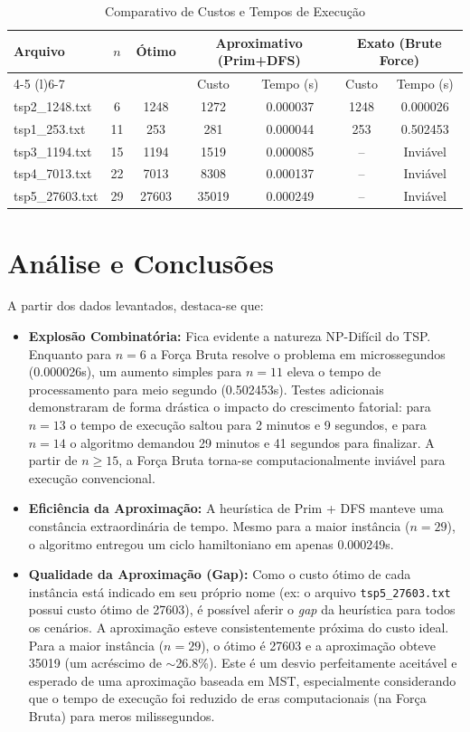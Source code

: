 \documentclass[12pt,a4paper]{article}
\begin{document}
\begin{table}[h]
\centering
\caption{Comparativo de Custos e Tempos de Execução}
\label{tab:resultados}
\vspace{0.2cm}
\begin{tabular}{@{}l c c cc cc@{}}
\toprule
\textbf{Arquivo} & \textbf{$n$} & \textbf{Ótimo} & \multicolumn{2}{c}{\textbf{Aproximativo (Prim+DFS)}} & \multicolumn{2}{c}{\textbf{Exato (Brute Force)}} \\
\cmidrule(lr){4-5} \cmidrule(l){6-7}
 & & & Custo & Tempo (s) & Custo & Tempo (s) \\
\midrule
tsp2\_1248.txt  & 6  & 1248  & 1272   & 0.000037 & 1248 & 0.000026 \\
tsp1\_253.txt   & 11 & 253   & 281    & 0.000044 & 253  & 0.502453 \\
tsp3\_1194.txt  & 15 & 1194  & 1519   & 0.000085 & --   & Inviável \\
tsp4\_7013.txt  & 22 & 7013  & 8308   & 0.000137 & --   & Inviável \\
tsp5\_27603.txt & 29 & 27603 & 35019  & 0.000249 & --   & Inviável \\
\bottomrule
\end{tabular}
\end{table}

\section{Análise e Conclusões}
A partir dos dados levantados, destaca-se que:
\begin{itemize}
    \item \textbf{Explosão Combinatória:} Fica evidente a natureza NP-Difícil do TSP. Enquanto para $n=6$ a Força Bruta resolve o problema em microssegundos (0.000026s), um aumento simples para $n=11$ eleva o tempo de processamento para meio segundo (0.502453s). Testes adicionais demonstraram de forma drástica o impacto do crescimento fatorial: para $n=13$ o tempo de execução saltou para 2 minutos e 9 segundos, e para $n=14$ o algoritmo demandou 29 minutos e 41 segundos para finalizar. A partir de $n \ge 15$, a Força Bruta torna-se computacionalmente inviável para execução convencional.
    \item \textbf{Eficiência da Aproximação:} A heurística de Prim + DFS manteve uma constância extraordinária de tempo. Mesmo para a maior instância ($n=29$), o algoritmo entregou um ciclo hamiltoniano em apenas 0.000249s.
    \item \textbf{Qualidade da Aproximação (Gap):} Como o custo ótimo de cada instância está indicado em seu próprio nome (ex: o arquivo \texttt{tsp5\_27603.txt} possui custo ótimo de 27603), é possível aferir o \textit{gap} da heurística para todos os cenários. A aproximação esteve consistentemente próxima do custo ideal. Para a maior instância ($n=29$), o ótimo é 27603 e a aproximação obteve 35019 (um acréscimo de $\sim$26.8\%). Este é um desvio perfeitamente aceitável e esperado de uma aproximação baseada em MST, especialmente considerando que o tempo de execução foi reduzido de eras computacionais (na Força Bruta) para meros milissegundos.
\end{itemize}
\end{document}
